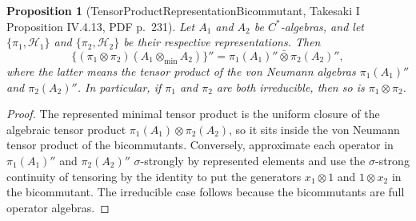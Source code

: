 \documentclass{article}
\newtheorem{proposition}[definition]{Proposition}
\begin{document}
\begin{proposition}[TensorProductRepresentationBicommutant, Takesaki I Proposition IV.4.13, PDF p.~231]
Let \(A_1\) and \(A_2\) be \(C^*\)-algebras, and let
\(\{\pi_1,\mathcal H_1\}\) and \(\{\pi_2,\mathcal H_2\}\) be their respective
representations.  Then
\[
  \{(\pi_1\otimes\pi_2)(A_1\otimes_{\min}A_2)\}''
  =
  \pi_1(A_1)''\bar\otimes\pi_2(A_2)'',
\]
where the latter means the tensor product of the von Neumann algebras
\(\pi_1(A_1)''\) and \(\pi_2(A_2)''\).  In particular, if \(\pi_1\) and
\(\pi_2\) are both irreducible, then so is \(\pi_1\otimes\pi_2\).
\end{proposition}

\begin{proof}
The represented minimal tensor product is the uniform closure of the algebraic
tensor product \(\pi_1(A_1)\otimes\pi_2(A_2)\), so it sits inside the von
Neumann tensor product of the bicommutants.  Conversely, approximate each
operator in \(\pi_1(A_1)''\) and \(\pi_2(A_2)''\) \(\sigma\)-strongly by
represented elements and use the \(\sigma\)-strong continuity of tensoring by
the identity to put the generators \(x_1\otimes 1\) and \(1\otimes x_2\) in
the bicommutant.  The irreducible case follows because the bicommutants are
full operator algebras.
\end{proof}
\end{document}
